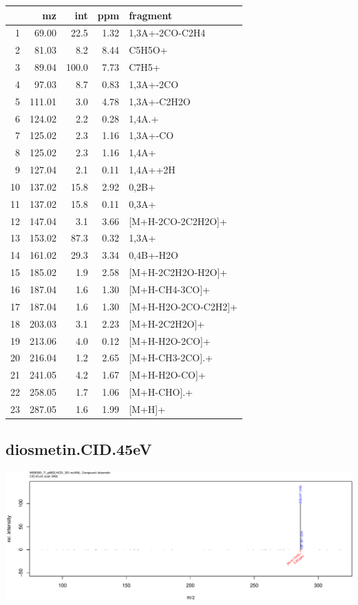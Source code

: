 \documentclass[]{article}
\begin{document}
\begin{table}[ht]
\centering
\begin{tabular}{rrrrl}
  \toprule
 & mz & int & ppm & fragment \\ 
  \midrule
1 & 69.00 & 22.5 & 1.32 & 1,3A+-2CO-C2H4 \\ 
  2 & 81.03 & 8.2 & 8.44 & C5H5O+ \\ 
  3 & 89.04 & 100.0 & 7.73 & C7H5+ \\ 
  4 & 97.03 & 8.7 & 0.83 & 1,3A+-2CO \\ 
  5 & 111.01 & 3.0 & 4.78 & 1,3A+-C2H2O \\ 
  6 & 124.02 & 2.2 & 0.28 & 1,4A.+ \\ 
  7 & 125.02 & 2.3 & 1.16 & 1,3A+-CO \\ 
  8 & 125.02 & 2.3 & 1.16 & 1,4A+ \\ 
  9 & 127.04 & 2.1 & 0.11 & 1,4A++2H \\ 
  10 & 137.02 & 15.8 & 2.92 & 0,2B+ \\ 
  11 & 137.02 & 15.8 & 0.11 & 0,3A+ \\ 
  12 & 147.04 & 3.1 & 3.66 & [M+H-2CO-2C2H2O]+ \\ 
  13 & 153.02 & 87.3 & 0.32 & 1,3A+ \\ 
  14 & 161.02 & 29.3 & 3.34 & 0,4B+-H2O \\ 
  15 & 185.02 & 1.9 & 2.58 & [M+H-2C2H2O-H2O]+ \\ 
  16 & 187.04 & 1.6 & 1.30 & [M+H-CH4-3CO]+ \\ 
  17 & 187.04 & 1.6 & 1.30 & [M+H-H2O-2CO-C2H2]+ \\ 
  18 & 203.03 & 3.1 & 2.23 & [M+H-2C2H2O]+ \\ 
  19 & 213.06 & 4.0 & 0.12 & [M+H-H2O-2CO]+ \\ 
  20 & 216.04 & 1.2 & 2.65 & [M+H-CH3-2CO].+ \\ 
  21 & 241.05 & 4.2 & 1.67 & [M+H-H2O-CO]+ \\ 
  22 & 258.05 & 1.7 & 1.06 & [M+H-CHO].+ \\ 
  23 & 287.05 & 1.6 & 1.99 & [M+H]+ \\ 
   \bottomrule
\end{tabular}
\end{table}

\clearpage\subsection{diosmetin.CID.45eV}
\includegraphics[width=\textwidth]{WEB350_files/figure-latex/unnamed-chunk-3-19}
\end{document}
